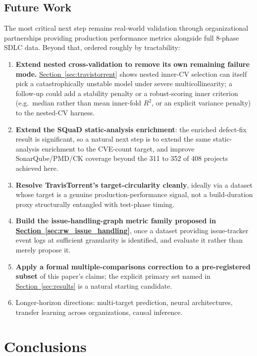 \documentclass[technologies,article,submit,pdftex,moreauthors]{Definitions/mdpi}
\providecommand{\tightlist}{%
  \setlength{\itemsep}{0pt}\setlength{\parskip}{0pt}}
\begin{document}
\subsection{Future Work}\label{sec:future_work}

The most critical next step remains real-world validation through organizational partnerships providing production performance metrics alongside full 8-phase SDLC data. Beyond that, ordered roughly by tractability:

\begin{enumerate}
\def\labelenumi{\arabic{enumi}.}
\tightlist
\item
  \textbf{Extend nested cross-validation to remove its own remaining failure mode.} \hyperref[sec:travistorrent]{Section~\ref*{sec:travistorrent}} shows nested inner-CV selection can itself pick a catastrophically unstable model under severe multicollinearity; a follow-up could add a stability penalty or a robust-scoring inner criterion (e.g.~median rather than mean inner-fold \(R^2\), or an explicit variance penalty) to the nested-CV harness.
\item
  \textbf{Extend the SQuaD static-analysis enrichment}: the enriched defect-fix result is significant, so a natural next step is to extend the same static-analysis enrichment to the CVE-count target, and improve SonarQube/PMD/CK coverage beyond the 311 to 352 of 408 projects achieved here.
\item
  \textbf{Resolve TravisTorrent's target-circularity cleanly}, ideally via a dataset whose target is a genuine production-performance signal, not a build-duration proxy structurally entangled with test-phase timing.
\item
  \textbf{Build the issue-handling-graph metric family proposed in \hyperref[sec:rw_issue_handling]{Section~\ref*{sec:rw_issue_handling}}}, once a dataset providing issue-tracker event logs at sufficient granularity is identified, and evaluate it rather than merely propose it.
\item
  \textbf{Apply a formal multiple-comparisons correction to a pre-registered subset} of this paper's claims; the explicit primary set named in \hyperref[sec:results]{Section~\ref*{sec:results}} is a natural starting candidate.
\item
  Longer-horizon directions: multi-target prediction, neural architectures, transfer learning across organizations, causal inference.
\end{enumerate}

\section{Conclusions}\label{sec:conclusions}
\end{document}
